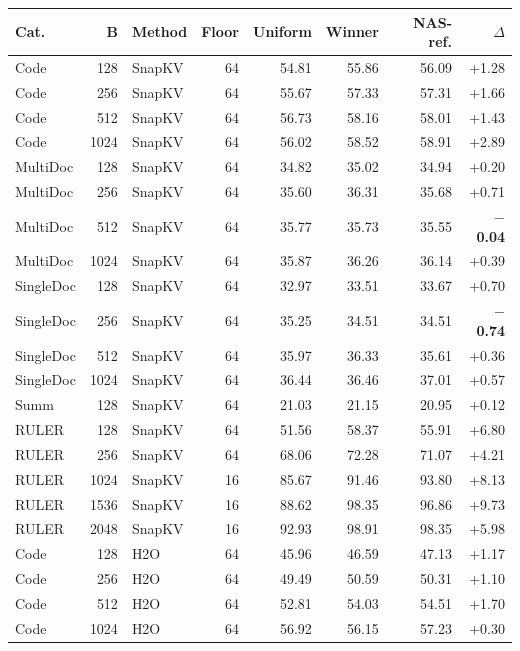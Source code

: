 \begin{table}[!b]
  \centering
  \scriptsize
  \setlength{\tabcolsep}{2.5pt}
  \begin{tabular}{@{}l r l r r r r r@{}}
    \toprule
    Cat. & B & Method & Floor & Uniform & Winner & NAS-ref. & $\Delta$ \\
    \midrule
    Code & 128 & SnapKV & 64 & 54.81 & 55.86 & 56.09 & +1.28 \\
    Code & 256 & SnapKV & 64 & 55.67 & 57.33 & 57.31 & +1.66 \\
    Code & 512 & SnapKV & 64 & 56.73 & 58.16 & 58.01 & +1.43 \\
    Code & 1024 & SnapKV & 64 & 56.02 & 58.52 & 58.91 & +2.89 \\
    MultiDoc & 128 & SnapKV & 64 & 34.82 & 35.02 & 34.94 & +0.20 \\
    MultiDoc & 256 & SnapKV & 64 & 35.60 & 36.31 & 35.68 & +0.71 \\
    MultiDoc & 512 & SnapKV & 64 & 35.77 & 35.73 & 35.55 & \textbf{$-$0.04} \\
    MultiDoc & 1024 & SnapKV & 64 & 35.87 & 36.26 & 36.14 & +0.39 \\
    SingleDoc & 128 & SnapKV & 64 & 32.97 & 33.51 & 33.67 & +0.70 \\
    SingleDoc & 256 & SnapKV & 64 & 35.25 & 34.51 & 34.51 & \textbf{$-$0.74} \\
    SingleDoc & 512 & SnapKV & 64 & 35.97 & 36.33 & 35.61 & +0.36 \\
    SingleDoc & 1024 & SnapKV & 64 & 36.44 & 36.46 & 37.01 & +0.57 \\
    Summ & 128 & SnapKV & 64 & 21.03 & 21.15 & 20.95 & +0.12 \\
    RULER & 128 & SnapKV & 64 & 51.56 & 58.37 & 55.91 & +6.80 \\
    RULER & 256 & SnapKV & 64 & 68.06 & 72.28 & 71.07 & +4.21 \\
    RULER & 1024 & SnapKV & 16 & 85.67 & 91.46 & 93.80 & +8.13 \\
    RULER & 1536 & SnapKV & 16 & 88.62 & 98.35 & 96.86 & +9.73 \\
    RULER & 2048 & SnapKV & 16 & 92.93 & 98.91 & 98.35 & +5.98 \\
    Code & 128 & H2O & 64 & 45.96 & 46.59 & 47.13 & +1.17 \\
    Code & 256 & H2O & 64 & 49.49 & 50.59 & 50.31 & +1.10 \\
    Code & 512 & H2O & 64 & 52.81 & 54.03 & 54.51 & +1.70 \\
    Code & 1024 & H2O & 64 & 56.92 & 56.15 & 57.23 & +0.30 \\

\end{tabular}
\end{table}
